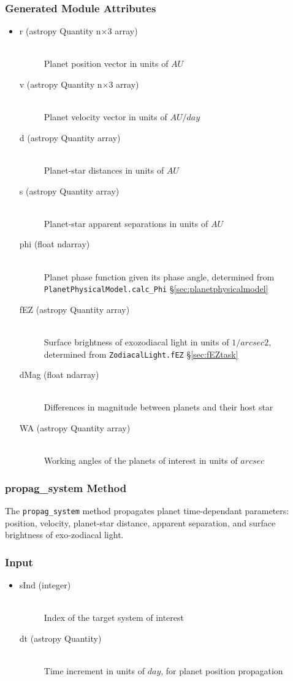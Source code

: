 \documentclass[cleanfoot]{asme2ej}
\begin{document}
\subsubsection*{Generated Module Attributes}
\begin{itemize}
\item 
\begin{description}
    \item[r (astropy Quantity n$\times$3 array)] \hfill \\ Planet position vector in units of $ AU $
    \item[v (astropy Quantity n$\times$3 array)] \hfill \\ Planet velocity vector in units of $ AU/day $
    \item[d (astropy Quantity array)] \hfill \\ Planet-star distances in units of $ AU $
    \item[s (astropy Quantity array)] \hfill \\ Planet-star apparent separations in units of $ AU $
    \item[phi (float ndarray)] \hfill \\ Planet phase function given its phase angle, determined from \verb+PlanetPhysicalModel.calc_Phi+ \S\ref{sec:planetphysicalmodel}
    \item[fEZ (astropy Quantity array)] \hfill \\ Surface brightness of exozodiacal light in units of $ 1/arcsec2 $, determined from \verb+ZodiacalLight.fEZ+ \S\ref{sec:fEZtask}
    \item[dMag (float ndarray)] \hfill \\ Differences in magnitude between planets and their host star
    \item[WA (astropy Quantity array)] \hfill \\ Working angles of the planets of interest in units of $arcsec$
\end{description}
\end{itemize}

\subsubsection{propag\_system Method} \label{sec:propagsystemtask}
The \verb+propag_system+ method propagates planet time-dependant parameters: position, velocity, planet-star distance, apparent separation, and surface brightness of exo-zodiacal light.
\subsubsection*{Input}
\begin{itemize}
\item 
\begin{description}
    \item[sInd (integer)] \hfill \\ Index of the target system of interest
    \item[dt (astropy Quantity)] \hfill \\ Time increment in units of $day$, for planet position propagation
\end{description}
\end{itemize}
\end{document}
